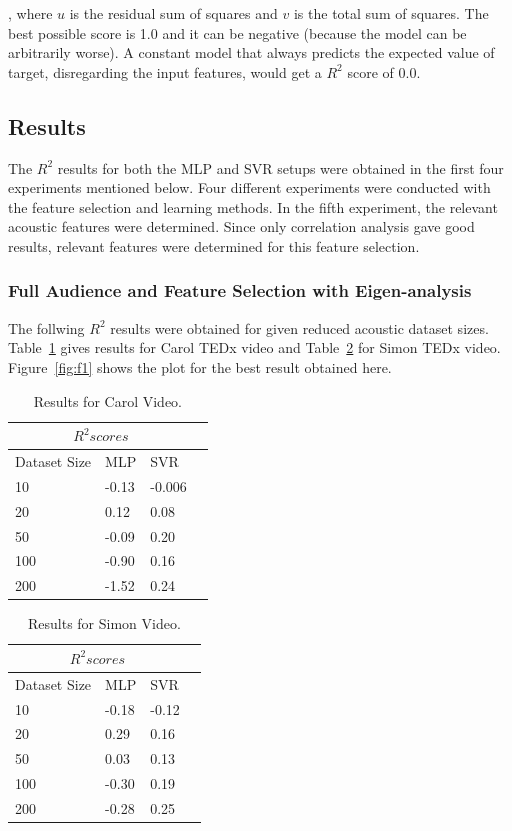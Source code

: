 , where $u$ is the residual sum of squares and $v$ is the total sum of squares. The best possible score is 1.0 and it can be negative (because the model can be arbitrarily worse). A constant model that always predicts the expected value of target, disregarding the input features, would get a $R^2$ score of 0.0.

\subsection{Results}
The $R^2$ results for both the MLP and SVR setups were obtained in the first four experiments mentioned below. Four different experiments were conducted with the feature selection and learning methods. In the fifth experiment, the relevant acoustic features were determined. Since only correlation analysis gave good results, relevant features were determined for this feature selection.

\subsubsection{Full Audience and Feature Selection with Eigen-analysis}

The follwing $R^2$ results were obtained for given reduced acoustic dataset sizes. Table~\ref{tab:carol1} gives results for Carol TEDx video and Table~\ref{tab:simon1} for Simon TEDx video. Figure~\ref{fig:f1} shows the plot for the best result obtained here.

\begin{table}
\centering
\begin{tabular}{ |p{3cm}||p{3cm}|p{3cm}|p{3cm}|  }
 \hline
 \multicolumn{3}{|c|}{$R^2 scores$} \\
 \hline
 Dataset Size &MLP &SVR\\
 \hline
 10 & -0.13 &-0.006\\
 20 & 0.12 & 0.08\\
 50 & -0.09 & 0.20\\
 100 & -0.90 & 0.16\\
 200 & -1.52 & 0.24\\
 \hline
\end{tabular}
\caption{\label{tab:carol1}Results for Carol Video.}
\end{table}

\begin{table}
\centering
\begin{tabular}{ |p{3cm}||p{3cm}|p{3cm}|p{3cm}|  }
 \hline
 \multicolumn{3}{|c|}{$R^2 scores$} \\
 \hline
 Dataset Size &MLP &SVR\\
 \hline
 10 & -0.18 &-0.12\\
 20 & 0.29 & 0.16\\
 50 & 0.03 & 0.13\\
 100 & -0.30 & 0.19\\
 200 & -0.28 & 0.25\\
 \hline
\end{tabular}
\caption{\label{tab:simon1}Results for Simon Video.}
\end{table}


